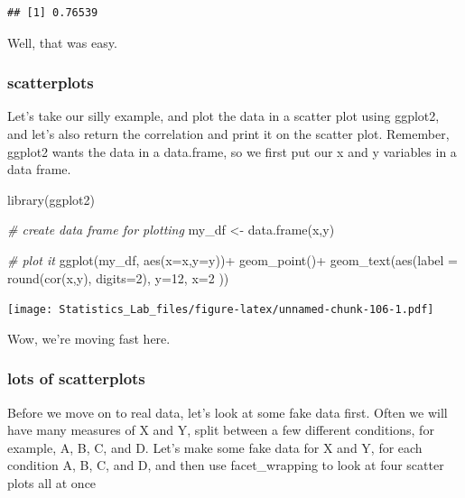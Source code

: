 \documentclass[
]{book}
\newenvironment{Shaded}{\begin{snugshade}}{\end{snugshade}}
\newcommand{\AttributeTok}[1]{\textcolor[rgb]{0.77,0.63,0.00}{#1}}
\newcommand{\CommentTok}[1]{\textcolor[rgb]{0.56,0.35,0.01}{\textit{#1}}}
\newcommand{\DecValTok}[1]{\textcolor[rgb]{0.00,0.00,0.81}{#1}}
\newcommand{\FunctionTok}[1]{\textcolor[rgb]{0.00,0.00,0.00}{#1}}
\newcommand{\NormalTok}[1]{#1}
\newcommand{\OtherTok}[1]{\textcolor[rgb]{0.56,0.35,0.01}{#1}}
\newcommand{\SpecialCharTok}[1]{\textcolor[rgb]{0.00,0.00,0.00}{#1}}
\begin{document}
\begin{verbatim}
## [1] 0.76539
\end{verbatim}

Well, that was easy.

\hypertarget{scatterplots-1}{%
\subsubsection{scatterplots}\label{scatterplots-1}}

Let's take our silly example, and plot the data in a scatter plot using ggplot2, and let's also return the correlation and print it on the scatter plot. Remember, ggplot2 wants the data in a data.frame, so we first put our x and y variables in a data frame.

\begin{Shaded}
\begin{Highlighting}[]
\FunctionTok{library}\NormalTok{(ggplot2)}

\CommentTok{\# create data frame for plotting}
\NormalTok{my\_df }\OtherTok{\textless{}{-}} \FunctionTok{data.frame}\NormalTok{(x,y)}

\CommentTok{\# plot it}
\FunctionTok{ggplot}\NormalTok{(my\_df, }\FunctionTok{aes}\NormalTok{(}\AttributeTok{x=}\NormalTok{x,}\AttributeTok{y=}\NormalTok{y))}\SpecialCharTok{+}
  \FunctionTok{geom\_point}\NormalTok{()}\SpecialCharTok{+}
  \FunctionTok{geom\_text}\NormalTok{(}\FunctionTok{aes}\NormalTok{(}\AttributeTok{label =} \FunctionTok{round}\NormalTok{(}\FunctionTok{cor}\NormalTok{(x,y), }\AttributeTok{digits=}\DecValTok{2}\NormalTok{), }\AttributeTok{y=}\DecValTok{12}\NormalTok{, }\AttributeTok{x=}\DecValTok{2}\NormalTok{ ))}
\end{Highlighting}
\end{Shaded}

\texttt{[image: Statistics\_Lab\_files/figure-latex/unnamed-chunk-106-1.pdf]}

Wow, we're moving fast here.

\hypertarget{lots-of-scatterplots}{%
\subsubsection{lots of scatterplots}\label{lots-of-scatterplots}}

Before we move on to real data, let's look at some fake data first. Often we will have many measures of X and Y, split between a few different conditions, for example, A, B, C, and D. Let's make some fake data for X and Y, for each condition A, B, C, and D, and then use facet\_wrapping to look at four scatter plots all at once
\end{document}
